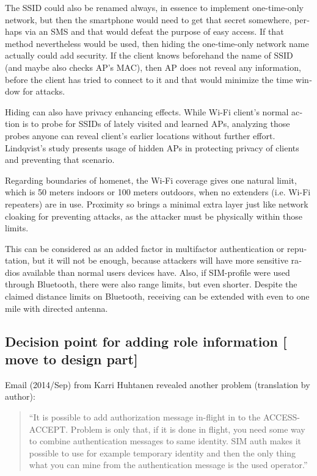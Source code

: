 \documentclass[12pt,a4paper,english]{tutthesis}
\begin{document}
\begin{otherlanguage}{english}
The SSID could also be renamed always, in essence to implement
one-time-only network, but then the smartphone would need to get that
secret somewhere, perhaps via an SMS and that would defeat the purpose
of easy access.  If that method nevertheless would be used, then
hiding the one-time-only network name actually could add security. 
If the client knows beforehand the name of SSID
(and maybe also checks AP's MAC), then AP does not reveal any information,
before the client has tried to connect to it and that would minimize
the time window for attacks.

 Hiding can also have privacy enhancing effects.
While Wi-Fi client's normal action is to probe for SSIDs of lately visited
and learned APs, analyzing those probes anyone can reveal client's earlier
locations without further effort.
Lindqvist's study\cite{hidden-wlan} presents usage of hidden
APs in protecting privacy of clients and  preventing that scenario.



Regarding boundaries of homenet, the Wi-Fi coverage gives 
one natural limit, which is 50 meters indoors or 100 meters outdoors,
when no extenders (i.e. Wi-Fi repeaters) are in use.
Proximity so brings a minimal extra layer just like network cloaking 
for preventing attacks, as the attacker must be physically within those limits.


This can be considered as an added factor in multifactor
authentication or reputation, but it will not be enough, because
attackers will have more sensitive  radios available than normal users
devices have. 
Also, if SIM-profile were used through Bluetooth, there were also
range limits, but even shorter. Despite the claimed distance limits
on Bluetooth, receiving can be extended with even to one mile with
directed antenna\cite{SANS-bluetooth-2007}.


\subsection{Decision point for adding role information [ move to design part]}
\label{sec-6-5-7}













Email (2014/Sep) from Karri Huhtanen revealed another
problem (translation by author):
\begin{quote}
``It is possible to add authorization message in-flight in to the
ACCESS-ACCEPT.
Problem is only that, if it is done in flight, you need some way to
combine authentication messages to same identity. SIM auth makes it
possible to use for example temporary identity and then the only thing
what you can mine from the authentication message is the used operator.''
\end{quote}


\end{otherlanguage}
\end{document}
